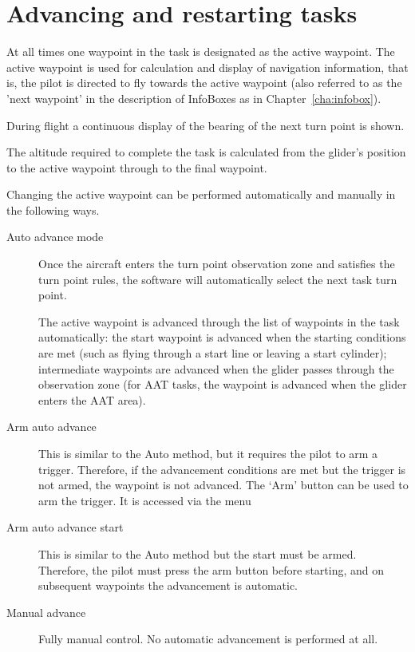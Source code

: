 \documentclass[a4paper,12pt]{refrep}
\begin{document}
\section{Advancing and restarting tasks}\label{sec:advanc-rest-tasks}

At all times one waypoint in the task is designated as the active
waypoint.  The active waypoint is used for calculation and display of
navigation information, that is, the pilot is directed to fly towards
the active waypoint (also referred to as the 'next waypoint' in the
description of InfoBoxes as in Chapter~\ref{cha:infobox}).

During flight a continuous display of the bearing of the next turn
point is shown.

The altitude required to complete the task is calculated from the
glider's position to the active waypoint through to the final
waypoint.

Changing the active waypoint can be performed automatically and
manually in the following ways.
\begin{description}
\item[Auto advance mode]
Once the aircraft enters the turn point observation zone and satisfies
the turn point rules, the software will automatically select the next
task turn point.

The active waypoint is advanced through the list of waypoints in the
task automatically: the start waypoint is advanced when the starting
conditions are met (such as flying through a start line or leaving a
start cylinder); intermediate waypoints are advanced when the glider
passes through the observation zone (for AAT tasks, the waypoint is
advanced when the glider enters the AAT area).
\item[Arm auto advance]
This is similar to the Auto method, but it requires the pilot to arm a
trigger.  Therefore, if the advancement conditions are met but the
trigger is not armed, the waypoint is not advanced.  The `Arm' button can be 
used to arm the trigger.  It is accessed via the menu
\begin{quote}
\blink{}
\end{quote}
\item[Arm auto advance start]
This is similar to the Auto method but the start must be armed.
Therefore, the pilot must press the arm button before starting, and on
subsequent waypoints the advancement is automatic.
\item[Manual advance]
Fully manual control.  No automatic advancement is performed at all.
\end{description}  
\end{document}
